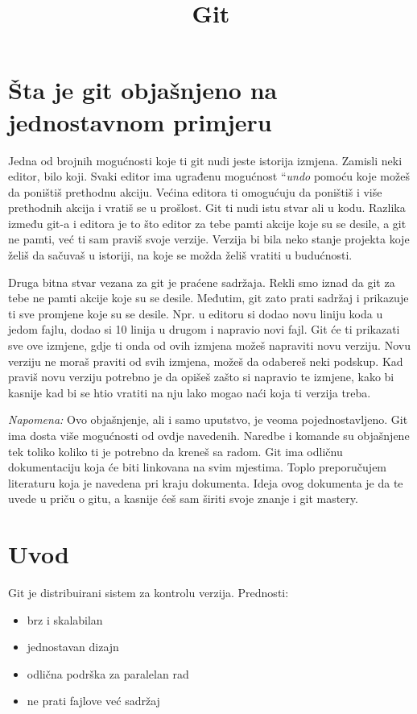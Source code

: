 \documentclass[11pt,a4paper]{article}
\title{Git}
\date{}
\begin{document}
\maketitle

\section{Šta je git objašnjeno na jednostavnom
primjeru}

Jedna od brojnih mogućnosti koje ti git nudi jeste istorija izmjena.
Zamisli neki editor, bilo koji. Svaki editor ima ugrađenu mogućnost
``\emph{undo} pomoću koje možeš da poništiš prethodnu akciju. Većina
editora ti omogućuju da poništiš i više prethodnih akcija i vratiš se u
prošlost. Git ti nudi istu stvar ali u kodu. Razlika između git-a i
editora je to što editor za tebe pamti akcije koje su se desile, a git
ne pamti, već ti sam praviš svoje verzije. Verzija bi bila neko stanje
projekta koje želiš da sačuvaš u istoriji, na koje se možda želiš
vratiti u budućnosti.

Druga bitna stvar vezana za git je praćene sadržaja. Rekli smo iznad da
git za tebe ne pamti akcije koje su se desile. Međutim, git zato prati
sadržaj i prikazuje ti sve promjene koje su se desile. Npr. u editoru si
dodao novu liniju koda u jedom fajlu, dodao si 10 linija u drugom i
napravio novi fajl. Git će ti prikazati sve ove izmjene, gdje ti onda od
ovih izmjena možeš napraviti novu verziju. Novu verziju ne moraš praviti
od svih izmjena, možeš da odabereš neki podskup. Kad praviš novu verziju
potrebno je da opišeš zašto si napravio te izmjene, kako bi kasnije kad
bi se htio vratiti na nju lako mogao naći koja ti verzija treba.

\emph{Napomena:} Ovo objašnjenje, ali i samo uputstvo, je veoma
pojednostavljeno. Git ima dosta više mogućnosti od ovdje navedenih.
Naredbe i komande su objašnjene tek toliko koliko ti je potrebno da
kreneš sa radom. Git ima odličnu dokumentaciju koja će biti linkovana na
svim mjestima. Toplo preporučujem literaturu koja je navedena pri kraju
dokumenta. Ideja ovog dokumenta je da te uvede u priču o gitu, a kasnije
ćeš sam širiti svoje znanje i git mastery.

\section{Uvod}

Git je distribuirani sistem za kontrolu verzija. Prednosti:

\begin{itemize}
\item
  brz i skalabilan
\item
  jednostavan dizajn
\item
  odlična podrška za paralelan rad
\item
  ne prati fajlove već sadržaj
\end{itemize}
\end{document}
